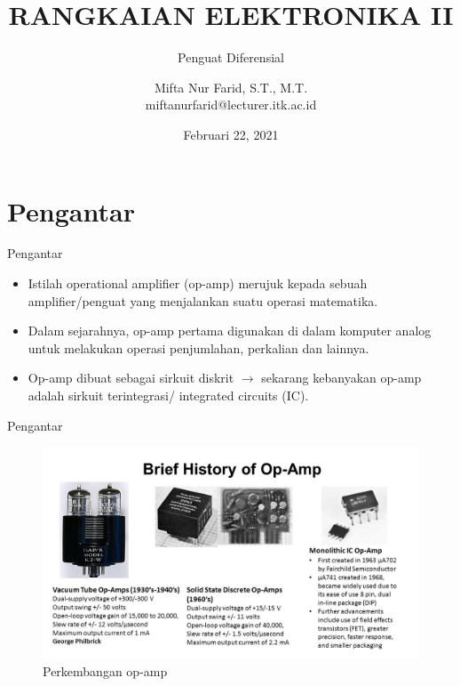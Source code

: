 \documentclass[aspectratio=169]{beamer}
\author{Mifta Nur Farid, S.T., M.T. \\
	miftanurfarid@lecturer.itk.ac.id}
\title{RANGKAIAN ELEKTRONIKA II}
\subtitle{Penguat Diferensial}
\institute{Teknik Elektro \\ Institut Teknologi Kalimantan \\ Balikpapan, Indonesia}
\date{\tiny Februari 22, 2021}
\begin{document}
\begin{frame}[t,plain]
\titlepage
\end{frame}


\section{Pengantar}
\begin{frame}{Pengantar}
	\begin{itemize}
		\item Istilah operational amplifier (op-amp) merujuk kepada sebuah amplifier/penguat yang menjalankan suatu operasi matematika.
		\item Dalam sejarahnya, op-amp pertama digunakan di dalam komputer analog untuk melakukan operasi penjumlahan, perkalian dan lainnya.
		\item Op-amp dibuat sebagai sirkuit diskrit $ \rightarrow $ sekarang kebanyakan op-amp adalah sirkuit terintegrasi/ integrated circuits (IC). 
	\end{itemize}
\end{frame}

\begin{frame}{Pengantar}
	\begin{figure}
		\centering
		\includegraphics[height=0.75\textheight]{gambar/01.history-op-amp}
		\caption{Perkembangan op-amp}
		\label{fig:history-op-amp}
	\end{figure}
\end{frame}
\end{document}
